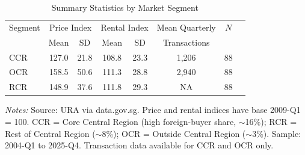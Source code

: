 \begin{table}[htbp]
\centering
\caption{Summary Statistics by Market Segment}\label{tab:sumstats}
\begin{threeparttable}
\begin{tabular}{lccccccc}
\toprule
Segment & \multicolumn{2}{c}{Price Index} & \multicolumn{2}{c}{Rental Index} & Mean Quarterly & $N$ \\
 & Mean & SD & Mean & SD & Transactions & \\
\midrule
CCR & 127.0 & 21.8 & 108.8 & 23.3 & 1,206 & 88 \\
OCR & 158.5 & 50.6 & 111.3 & 28.8 & 2,940 & 88 \\
RCR & 148.9 & 37.6 & 111.8 & 29.3 & NA & 88 \\
\bottomrule
\end{tabular}
\begin{tablenotes}[flushleft]\small
\item \textit{Notes:} Source: URA via data.gov.sg. Price and rental indices have base 2009-Q1 = 100. CCR = Core Central Region (high foreign-buyer share, $\sim$16\%); RCR = Rest of Central Region ($\sim$8\%); OCR = Outside Central Region ($\sim$3\%). Sample: 2004-Q1 to 2025-Q4. Transaction data available for CCR and OCR only.
\end{tablenotes}
\end{threeparttable}
\end{table}

